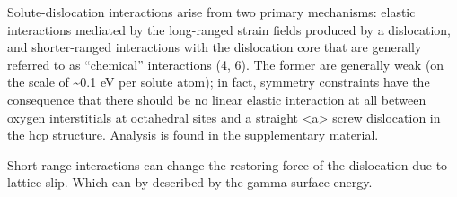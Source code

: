 \documentclass[a4paper,11pt]{article}
\numberwithin{equation}{chapter}
\numberwithin{listing}{chapter}
\begin{document}
Solute-dislocation interactions arise from two primary mechanisms:
elastic interactions mediated by the long-ranged strain fields
produced by a dislocation, and shorter-ranged interactions with the
dislocation core that are generally referred to as “chemical”
interactions (4, 6). The former are generally weak (on the scale of
\textasciitilde{}0.1 eV per solute atom); in fact, symmetry constraints have the
consequence that there should be no linear elastic interaction at
all between oxygen interstitials at octahedral sites and a straight
<a> screw dislocation in the hcp structure. Analysis is found in
the supplementary material. 


Short range interactions can change the restoring force of the
dislocation due to lattice slip. Which can by described by the
gamma surface energy. 
\end{document}
